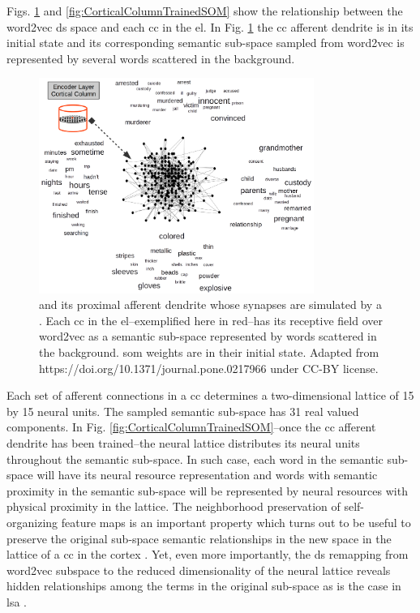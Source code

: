 {Figs. \ref{fig:CorticalColumnSOM} and \ref{fig:CorticalColumnTrainedSOM} show the relationship between the word2vec \gls{ds} space and each \gls{cc} in the \gls{el}.
In Fig. \ref{fig:CorticalColumnSOM} the \gls{cc} afferent dendrite is in its initial state and its corresponding semantic sub-space sampled from word2vec is represented by several words scattered in the background.
 
\begin{figure}[ht!]
    \centering
    \includegraphics[width=0.8\textwidth]{CorticalColumnSOM.png}
    \caption{  and its proximal afferent dendrite whose synapses are simulated by a . Each \gls{cc} in the \gls{el}--exemplified here in red--has its receptive field over word2vec as a semantic sub-space represented by words scattered in the background. \gls{som} weights are in their initial state. Adapted from https://doi.org/10.1371/journal.pone.0217966 under CC-BY license.}
    \label{fig:CorticalColumnSOM}
\end{figure}

Each set of afferent connections in a \gls{cc} determines a two-dimensional lattice of 15 by 15 neural units. The sampled semantic sub-space has 31 real valued components.
In Fig. \ref{fig:CorticalColumnTrainedSOM}--once the \gls{cc} afferent dendrite has been trained--the neural lattice distributes its neural units throughout the semantic sub-space. In such case, each word in the semantic sub-space will have its neural resource representation and words with semantic proximity in the semantic sub-space will be represented by neural resources with physical proximity in the lattice. The neighborhood preservation of self-organizing feature maps is an important property which turns out to be useful to preserve the original sub-space semantic relationships in the new space in the lattice of a \gls{cc} in the cortex \cite{557663}. Yet, even more importantly, the \gls{ds} remapping from word2vec subspace to the reduced dimensionality of the neural lattice reveals hidden relationships among the terms in the original sub-space as is the case in \gls{lsa} \cite{key:article}.

}
